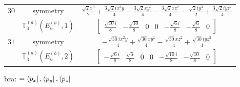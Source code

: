 \documentclass[fleqn,8pt,landscape]{jsarticle}
\begin{document}
\begin{longtable}{ccc}
$ 30 $ & $ \text{symmetry} $ & $ \frac{\sqrt{2} x^{3}}{2} + \frac{3 \sqrt{2} i x^{2} y}{4} - \frac{3 \sqrt{2} x y^{2}}{4} - \frac{3 \sqrt{2} x z^{2}}{4} - \frac{\sqrt{2} i y^{3}}{2} + \frac{3 \sqrt{2} i y z^{2}}{4} $ \\
$  $ & $ \mathbb{T}_{3}^{(a)}(E_{u}^{(b)},1) $ & $ \begin{bmatrix} \frac{\sqrt{10} i}{8} & - \frac{\sqrt{10}}{8} & 0 & 0 & - \frac{\sqrt{6} i}{8} & - \frac{\sqrt{6}}{8} & 0 \end{bmatrix} $ \\ \hline
$ 31 $ & $ \text{symmetry} $ & $ - \frac{\sqrt{30} i x^{2} y}{4} + \frac{\sqrt{30} x y^{2}}{4} - \frac{\sqrt{30} x z^{2}}{4} + \frac{\sqrt{30} i y z^{2}}{4} $ \\
$  $ & $ \mathbb{T}_{3}^{(a)}(E_{u}^{(b)},2) $ & $ \begin{bmatrix} - \frac{\sqrt{6} i}{8} & \frac{\sqrt{6}}{8} & 0 & 0 & - \frac{\sqrt{10} i}{8} & - \frac{\sqrt{10}}{8} & 0 \end{bmatrix} $ \\ \hline
\end{longtable}
bra: $=\bra{p_{x}}, \bra{p_{y}}, \bra{p_{z}}$
\end{document}
